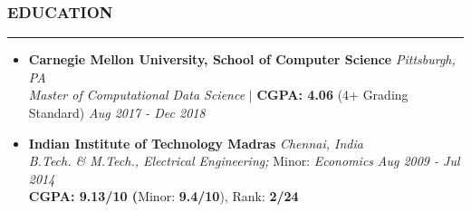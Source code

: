 \documentclass[10pt,a4paper,English]{article}
\newcommand\roottitle[1]{\vspace{-4mm}\subsubsection*{\uppercase{#1}}\vspace{-0.3em}\nopagebreak[4]\hrule\vspace{4mm}}
\newcommand\itemyear[1]{\hfill \emph{\color{itemyear} #1}}
\newcommand\itemenvnoindent{\setlength\itemsep{-1pt} \vspace{-1.5mm}}
\newcommand\hspacing{1mm}
\begin{document}
\roottitle{Education}
    \begin{itemize}[leftmargin=11pt] \itemenvnoindent
    
    \item \textbf{Carnegie Mellon University, School of Computer Science} \itemyear{Pittsburgh, PA}\\[\hspacing]
        \textit{Master of Computational Data Science} $\vert$ \textbf{CGPA: 4.06} (4+ Grading Standard) \itemyear{Aug 2017 - Dec 2018} \\[\hspacing]
    \vspace{-3mm}

    \item \textbf{Indian Institute of Technology Madras}  \itemyear{Chennai, India}\\[\hspacing]
        \textit{B.Tech. \& M.Tech., Electrical Engineering;} Minor: \textit{Economics} \itemyear{Aug 2009 - Jul 2014}\\[\hspacing]
        \textbf{CGPA: 9.13/10 (}Minor: \textbf{9.4/10}), Rank: \textbf{2/24} \\[\hspacing]
    \end{itemize}

\vspace{-3.5mm}
\end{document}
